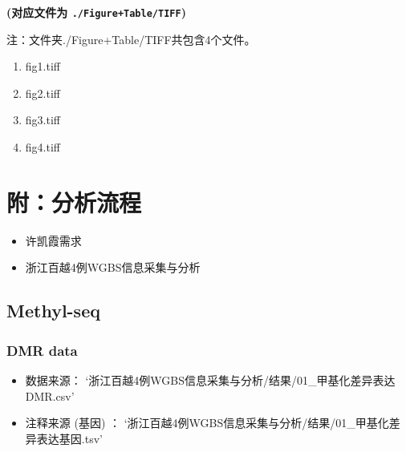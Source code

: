 \documentclass[
]{article}
\providecommand{\tightlist}{%
  \setlength{\itemsep}{0pt}\setlength{\parskip}{0pt}}
\begin{document}
\textbf{(对应文件为 \texttt{./Figure+Table/TIFF})}

\begin{center}\begin{tcolorbox}[colback=gray!10, colframe=gray!50, width=0.9\linewidth, arc=1mm, boxrule=0.5pt]注：文件夹./Figure+Table/TIFF共包含4个文件。

\begin{enumerate}\tightlist
\item fig1.tiff
\item fig2.tiff
\item fig3.tiff
\item fig4.tiff
\end{enumerate}\end{tcolorbox}
\end{center}

\begin{center}\vspace{1.5cm}\end{center}

\hypertarget{workflow}{%
\section{附：分析流程}\label{workflow}}

\begin{itemize}
\tightlist
\item
  许凯霞需求
\item
  浙江百越4例WGBS信息采集与分析
\end{itemize}

\hypertarget{methyl-seq}{%
\subsection{Methyl-seq}\label{methyl-seq}}

\hypertarget{data}{%
\subsubsection{DMR data}\label{data}}

\begin{itemize}
\tightlist
\item
  数据来源： `浙江百越4例WGBS信息采集与分析/结果/01\_甲基化差异表达DMR.csv'
\item
  注释来源 (基因) ： `浙江百越4例WGBS信息采集与分析/结果/01\_甲基化差异表达基因.tsv'
\end{itemize}
\end{document}
